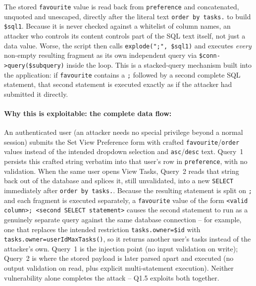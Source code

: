 The stored \texttt{favourite} value is read back from \texttt{preference}
and concatenated, unquoted and unescaped, directly after the literal text
\texttt{order by tasks.} to build \texttt{\$sql1}. Because it is never
checked against a whitelist of column names, an attacker who controls its
content controls part of the SQL text itself, not just a data value. Worse,
the script then calls \texttt{explode(";", \$sql1)} and executes
\emph{every} non-empty resulting fragment as its own independent query via
\texttt{\$conn->query(\$subquery)} inside the loop. This is a stacked-query
mechanism built into the application: if \texttt{favourite} contains a
\texttt{;} followed by a second complete SQL statement, that second
statement is executed exactly as if the attacker had submitted it directly.

\paragraph{Why this is exploitable: the complete data flow:} An
authenticated user (an attacker needs no special privilege beyond a normal
session) submits the Set View Preference form with crafted
\texttt{favourite}/\texttt{order} values instead of the intended dropdown
selection and \texttt{asc}/\texttt{desc} text. Query~1 persists this
crafted string verbatim into that user's row in \texttt{preference}, with no
validation. When the same user opens View Tasks, Query~2 reads that string
back out of the database and splices it, still unvalidated, into a new
\texttt{SELECT} immediately after \texttt{order by tasks.}. Because the
resulting statement is split on \texttt{;} and each fragment is executed
separately, a \texttt{favourite} value of the form
\texttt{<valid column>; <second SELECT statement>} causes the second
statement to run as a genuinely separate query against the same database
connection -- for example, one that replaces the intended restriction
\texttt{tasks.owner=\$id} with \texttt{tasks.owner=userIdMaxTasks()}, so it
returns another user's tasks instead of the attacker's own. Query~1 is the
injection point (no input validation on write); Query~2 is where the stored
payload is later parsed apart and executed (no output validation on read,
plus explicit multi-statement execution). Neither vulnerability alone
completes the attack -- Q1.5 exploits both together.


